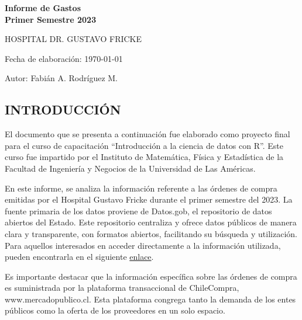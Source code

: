 \documentclass[
]{article}
\author{}
\date{\vspace{-2.5em}}
\begin{document}
\begin{titlepage}
\centering



\vspace{2cm} %

{\Huge\bfseries Informe de Gastos\\ Primer Semestre 2023\par} 

\vspace{1.5cm}

{\Large HOSPITAL DR. GUSTAVO FRICKE \par} 

\vspace{2cm}

{\Large Fecha de elaboración: \today\par} %

\vfill %

{\large Autor: Fabián A. Rodríguez M.\par} %

\end{titlepage}


\newpage

\hypertarget{introducciuxf3n}{%
\subsection{INTRODUCCIÓN}\label{introducciuxf3n}}

El documento que se presenta a continuación fue elaborado como proyecto
final para el curso de capacitación ``Introducción a la ciencia de datos
con R''. Este curso fue impartido por el Instituto de Matemática, Física
y Estadística de la Facultad de Ingeniería y Negocios de la Universidad
de Las Américas.

En este informe, se analiza la información referente a las órdenes de
compra emitidas por el Hospital Gustavo Fricke durante el primer
semestre del 2023. La fuente primaria de los datos proviene de
Datos.gob, el repositorio de datos abiertos del Estado. Este repositorio
centraliza y ofrece datos públicos de manera clara y transparente, con
formatos abiertos, facilitando su búsqueda y utilización. Para aquellos
interesados en acceder directamente a la información utilizada, pueden
encontrarla en el siguiente
\href{https://chc-oc-files.s3.amazonaws.com/entcode/2023/Sem1/6936.7z}{enlace}.

Es importante destacar que la información específica sobre las órdenes
de compra es suministrada por la plataforma transaccional de
ChileCompra, www.mercadopublico.cl. Esta plataforma congrega tanto la
demanda de los entes públicos como la oferta de los proveedores en un
solo espacio.
\end{document}
